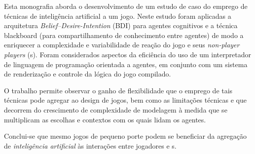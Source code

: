 Esta monografia aborda o desenvolvimento de um estudo de caso do emprego de técnicas de inteligência artificial a um jogo. Neste estudo foram aplicadas a arquitetura \emph{Belief--Desire-Intention} (BDI) para agentes cognitivos e a técnica blackboard (para compartilhamento de conhecimento entre agentes) de modo a enriquecer a complexidade e variabilidade de reação do jogo e seus \emph{non-player players} (\npc{}s). Foram considerados aspectos da eficiência do uso de um interpretador de linguagem de programação orientada a agentes, em conjunto com um sistema de renderização e controle da lógica do jogo compilado.

O trabalho permite observar o ganho de flexibilidade que o emprego de tais técnicas pode agregar ao design de jogos, bem como as limitações técnicas e que decorrem do crescimento de complexidade de modelagem à medida que se multiplicam as escolhas e contextos com os quais lidam os agentes.

Conclui-se que mesmo jogos de pequeno porte podem se beneficiar da
agregação de \emph{inteligência artificial} às interações entre jogadores
e \npc{}s.


